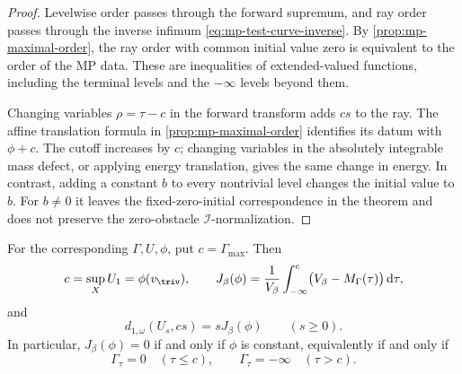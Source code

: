\begin{proof}
Levelwise order passes through the forward supremum, and ray order passes through the inverse infimum \eqref{eq:mp-test-curve-inverse}. By \cref{prop:mp-maximal-order}, the ray order with common initial value zero is equivalent to the order of the MP data. These are inequalities of extended-valued functions, including the terminal levels and the $-\infty$ levels beyond them.

Changing variables $\rho=\tau-c$ in the forward transform adds $cs$ to the ray. The affine translation formula in \cref{prop:mp-maximal-order} identifies its datum with $\phi+c$. The cutoff increases by $c$; changing variables in the absolutely integrable mass defect, or applying energy translation, gives the same change in energy. In contrast, adding a constant $b$ to every nontrivial level changes the initial value to $b$. For $b\ne0$ it leaves the fixed-zero-initial correspondence in the theorem and does not preserve the zero-obstacle $\mathcal I$-normalization.
\end{proof}

\begin{samepage}
\begin{corollary}\label{cor:mp-test-curve-mass-defect}
For the corresponding $\Gamma,U,\phi$, put $c=\Gamma_{\max}$. Then
\[
 c=\sup_X U_1=\phi(v_{\triv}),\qquad
 J_\beta(\phi)=\frac1{V_\beta}\int_{-\infty}^{c}
                    \bigl(V_\beta-M_\Gamma(\tau)\bigr)\,\mathrm{d}\tau,
\]
and
\[
 d_{1,\omega}(U_s,cs)=sJ_\beta(\phi)\qquad(s\geq0).
\tag{60.23j}\label{eq:mp-test-curve-defect-distance}
\]
In particular, $J_\beta(\phi)=0$ if and only if $\phi$ is constant, equivalently if and only if
\[
 \Gamma_\tau=0\quad(\tau\leq c),\qquad
 \Gamma_\tau=-\infty\quad(\tau>c).
\]
\end{corollary}
\end{samepage}

